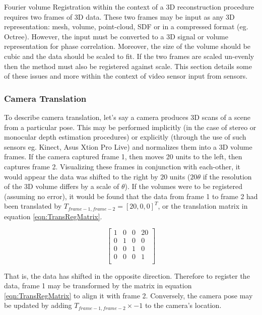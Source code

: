 Fourier volume Registration within the context of a 3D reconstruction procedure requires two frames of 3D data. These two frames may be input as any 3D representation: mesh, volume, point-cloud, SDF or in a compressed format (eg. Octree). However, the input must be converted to a 3D signal or volume representation for phase correlation. Moreover, the size of the volume should be cubic and the data should be scaled to fit. If the two frames are scaled un-evenly then the method must also be registered against scale. This section details some of these issues and more within the context of video sensor input from sensors.  \\
 

\subsubsection{Camera Translation}

To describe camera translation, let's say a camera produces 3D scans of a scene from a particular pose. This may be performed implicitly (in the case of stereo or monocular depth estimation procedures) or explicitly (through the use of such sensors eg. Kinect, Asus Xtion Pro Live) and normalizes them into a 3D volume frames. If the camera captured frame 1, then moves 20 units to the left, then captures frame 2. Visualizing these frames in conjunction with each-other, it would appear the data was shifted to the right by $20$ units ($20\theta$ if the resolution of the 3D volume differs by a scale of $\theta$). If the volumes were to be registered (assuming no error), it would be found that the data from frame 1 to frame 2 had been translated by $T_{frame-1,frame-2} = [20,0,0]^T$, or the translation matrix in equation \ref{eqn:TransRegMatrix}.

\begin{equation} \label{eqn:TransRegMatrix}
\left[
\begin{array}{cccc}
1 & 0 & 0 & 20 \\
0 & 1 & 0 & 0 \\
0 & 0 & 1 & 0 \\
0 & 0 & 0 & 1 \\
\end{array}
\right]
\end{equation}

That is, the data has shifted in the opposite direction. Therefore to register the data, frame 1 may be transformed by the matrix in equation \ref{eqn:TransRegMatrix} to align it with frame 2. Conversely, the camera pose may be updated by adding $T_{frame-1,frame-2} \times -1$ to the camera's location.  \\

